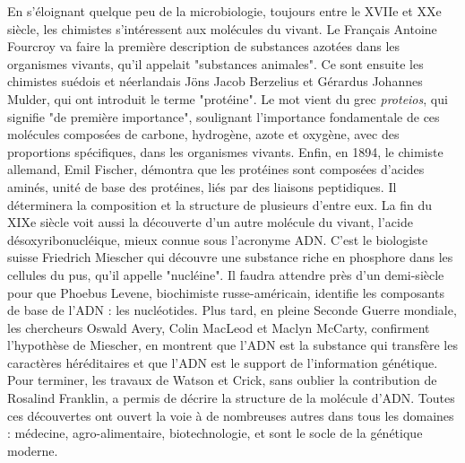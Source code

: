 En s'éloignant quelque peu de la microbiologie, toujours entre le XVIIe et XXe siècle, les chimistes s'intéressent aux molécules du vivant. Le Français Antoine Fourcroy va faire la première description de substances azotées dans les organismes vivants, qu'il appelait "substances animales". Ce sont ensuite les chimistes suédois et néerlandais Jöns Jacob Berzelius et Gérardus Johannes Mulder, qui ont introduit le terme "protéine". Le mot vient du grec \textit{proteios}, qui signifie "de première importance", soulignant l'importance fondamentale de ces molécules composées de carbone, hydrogène, azote et oxygène, avec des proportions spécifiques, dans les organismes vivants. Enfin, en 1894, le chimiste allemand, Emil Fischer, démontra que les protéines sont composées d'acides aminés, unité de base des protéines, liés par des liaisons peptidiques. Il déterminera la composition et la structure de plusieurs d'entre eux. La fin du XIXe siècle voit aussi la découverte d'un autre molécule du vivant, l'acide désoxyribonucléique, mieux connue sous l'acronyme ADN. C'est le biologiste suisse Friedrich Miescher qui découvre une substance riche en phosphore dans les cellules du pus, qu'il appelle "nucléine". Il faudra attendre près d'un demi-siècle pour que Phoebus Levene, biochimiste russe-américain, identifie les composants de base de l'ADN : les nucléotides. Plus tard, en pleine Seconde Guerre mondiale, les chercheurs Oswald Avery, Colin MacLeod et Maclyn McCarty, confirment l'hypothèse de Miescher, en montrent que l’ADN est la substance qui transfère les caractères héréditaires et que l'ADN est le support de l’information génétique. Pour terminer, les travaux de Watson et Crick, sans oublier la contribution de Rosalind Franklin, a permis de décrire la structure de la molécule d'ADN. Toutes ces découvertes ont ouvert la voie à de nombreuses autres dans tous les domaines : médecine, agro-alimentaire, biotechnologie, et sont le socle de la génétique moderne.


